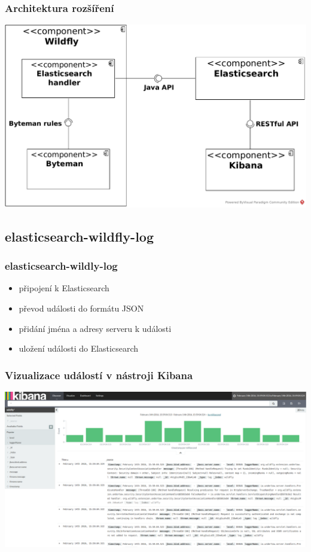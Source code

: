 \documentclass{beamer}
\begin{document}
\begin{frame}
\frametitle{Architektura rozšíření}
\includegraphics[width=\textwidth]{../images/component_diagram}
\end{frame}


\subsection{elasticsearch-wildfly-log}

\begin{frame}
	\frametitle{elasticsearch-wildly-log}
	\begin{itemize}
		\item připojení k Elasticsearch
		\item převod události do formátu JSON
		\item přidání jména a adresy serveru k události
		\item uložení události do Elasticsearch
	\end{itemize}
\end{frame}

\begin{frame}
\frametitle{Vizualizace událostí v nástroji Kibana}
\includegraphics[width=\textwidth]{kibana}
\end{frame}
\end{document}
